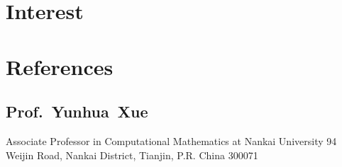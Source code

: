 \documentclass[11pt,a4paper, final]{moderncv}
\newcommand{\spacesection}{\vspace{0.4cm}}
\newcommand{\spacesubsection}{\vspace{0.2cm}}
\begin{document}
\section{\textbf{Interest}}
\clearpage
\section{\textbf{References}}
	\subsection{\textbf{Prof.~Yunhua~Xue}}
		\cvline{}
		{Associate Professor in Computational Mathematics at Nankai University}
		{94 Weijin Road, Nankai District, Tianjin, P.R. China 300071}
\end{document}
